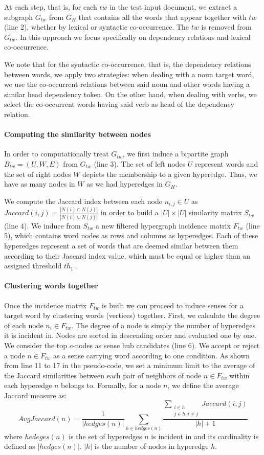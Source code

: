 At each step, that is, for each $tw$ in the test input document, we extract a subgraph $G_{tw}$ from $G_H$ that contains all the words that appear together with $tw$ (line 2), whether by lexical or syntactic co-occurrence. The $tw$ is removed from $G_{tw}$. In this approach we focus specifically on dependency relations and lexical co-occurrence. 

We note that for the syntactic co-occurrence, that is, the dependency relations between words, we apply two strategies: when dealing with a noun target word, we use the co-occurrent relations between said noun and other words having a similar head dependency token. On the other hand, when dealing with verbs, we select the co-occurrent words having said verb as head of the dependency relation.  

\paragraph{Computing the similarity between nodes}
In order to computationally treat $G_{tw}$, we first induce a bipartite graph $B_{tw}=(U,W,E)$ from $G_{tw}$ (line 3). The set of left nodes $U$ represent words and the set of right nodes $W$ depicts the membership to a given hyperedge. Thus, we have as many nodes in $W$  as we had hyperedges in $G_H$.

We compute the Jaccard index between each node $n_{i,j} \in U$ as $Jaccard(i,j)=\frac{|N(i)\cap N(j)|}{|N(i)\cup N(j)|}$ in order to build a $|U|\times|U|$ similarity matrix $S_{tw}$ (line 4). We induce from $S_{tw}$ a new filtered  hypergraph incidence matrix $F_{tw}$ (line 5), which contains word nodes as rows and columns as hyperedges. Each of these hyperedges represent a set of words that are deemed similar between them according to their Jaccard  index value, which must be equal or higher than an assigned threshold $th_1$ .  

\paragraph{Clustering words  together}
Once the incidence matrix $F_{tw}$ is built we can proceed to induce senses for a target word by clustering words (vertices) together. First, we calculate the degree of each node $n_i \in F_{tw}$. The degree of a node is simply the number of hyperedges it is incident in. Nodes are sorted in descending order and evaluated one by one. We consider the top $c$-nodes as sense hub candidates (line 6). We accept or reject a node $n \in F_{tw}$ as a sense carrying word according to one condition. As shown from line 11 to 17 in the pseudo-code, we set a minimum limit to the average of the Jaccard similarities between each pair of neighbors of node $n \in F_{tw}$ within each hyperedge  $n$ belongs to. Formally, for a node $n$, we define the average Jaccard measure as: $$AvgJaccard(n)=\frac{1}{|hedges(n)|}\sum_{h\in hedges(n)}\frac{\sum_{\substack{i\in h\\j\in h;i\neq j}}Jaccard(i,j)}{|h| + 1}$$ 
where $hedeges(n)$ is the set of hyperedges $n$ is incident in and its cardinality is defined as $|hedges(n)|$. $|h|$ is the number of nodes in hyperedge $h$. 

